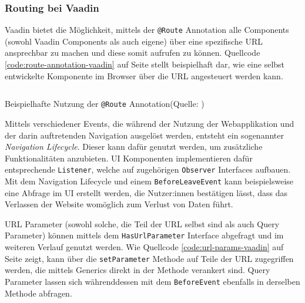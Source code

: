 \documentclass[a4paper,12pt,twoside]{scrreprt}
\begin{document}
\subsubsection{Routing bei Vaadin}
\label{sub-sub-sec:routing-herangehensweise-vaadin}
Vaadin bietet die Möglichkeit, mittels der \texttt{@Route} Annotation alle Components (sowohl Vaadin Components als auch eigene) über eine spezifische URL ansprechbar zu machen und diese somit aufrufen zu können. Quellcode \ref{code:route-annotation-vaadin} auf Seite    \pageref{code:route-annotation-vaadin} stellt beispielhaft dar, wie eine selbst entwickelte Komponente im Browser über die URL  angesteuert werden kann. \parencite[][Using the @Route Annotation]{vaadin_ltd_overview_2021-1}

\begin{listing}[ht]
    \inputminted[fontsize=\footnotesize,linenos]{java}{code/Vaadin_Route-annotation.java}
    \caption[Beispielhafte Nutzung der \texttt{@Route} Annotation]{Beispielhafte Nutzung der \texttt{@Route} Annotation\newline(Quelle: \cite[][Using the @Route Annotation]{vaadin_ltd_overview_2021-1})}
    \label{code:route-annotation-vaadin}
\end{listing}

Mittels verschiedener Events, die während der Nutzung der Webapplikation und der darin auftretenden Navigation ausgelöst werden, entsteht ein sogenannter \textit{Navigation Lifecycle}. Dieser kann dafür genutzt werden, um zusätzliche Funktionalitäten anzubieten. UI Komponenten implementieren dafür entsprechende \texttt{Listener}, welche auf zugehörigen \texttt{Observer} Interfaces aufbauen. Mit dem Navigation Lifecycle und einem \texttt{BeforeLeaveEvent} kann beispielsweise eine Abfrage im \acl{UI} erstellt werden, die Nutzer:innen bestätigen lässt, dass das Verlassen der Website womöglich zum Verlust von Daten führt. \parencite[][]{vaadin_ltd_navigation_2021}

\newpage

URL Parameter (sowohl solche, die Teil der URL selbst sind als auch Query Parameter) können mittels dem \texttt{HasUrlParameter} Interface abgefragt und im weiteren Verlauf genutzt werden. Wie Quellcode \ref{code:url-params-vaadin} auf Seite \pageref{code:url-params-vaadin} zeigt, kann über die \texttt{setParameter} Methode auf Teile der URL zugegriffen werden, die mittels Generics direkt in der Methode verankert sind. \parencite[][]{vaadin_ltd_typed_2021} Query Parameter lassen sich währenddessen mit dem \texttt{BeforeEvent} ebenfalls in derselben Methode abfragen. \parencite[][]{vaadin_ltd_query_2021}
\end{document}
